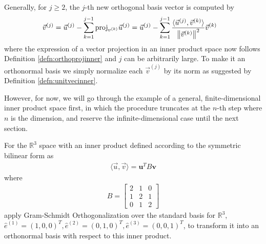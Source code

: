 \begin{defn}
\begin{align}
\end{align}
Generally, for $j \geq 2$, the $j$-th new orthogonal basis vector is computed by
\begin{align}
\vec{v}^{(j)} &= \vec{u}^{(j)} - \sum_{k=1}^{j-1}\text{proj}_{v^{(k)}}\vec{u}^{(j)}  = \vec{u}^{(j)} - \sum_{k=1}^{j-1}\frac{\langle \vec{u}^{(j)}, \vec{v}^{(k)} \rangle}{\norm{\vec{v}^{(k)}}^2} \vec{v}^{(k)}
\end{align}
where the expression of a vector projection in an inner product space now follows Definition \ref{defn:orthoprojinner} and $j$ can be arbitrarily large. To make it an orthonormal basis we simply normalize each $\vec{v}^{(j)}$ by its norm as suggested by Definition \ref{defn:unitvecinner}.  
\end{defn}
However, for now, we will go through the example of a general, finite-dimensional inner product space first, in which the procedure truncates at the $n$-th step where $n$ is the dimension, and reserve the infinite-dimensional case until the next section.
\begin{exmp}
\label{exmp:R3innerGS}
For the $\mathbb{R}^3$ space with an inner product defined according to the symmetric bilinear form as
\begin{align*}
\langle \vec{u}, \vec{v} \rangle = \textbf{u}^TB\textbf{v}
\end{align*}
where 
\begin{align*}
B =
\begin{bmatrix}
2&1&0\\ 
1&2&1\\
0&1&2
\end{bmatrix}
\end{align*}
apply Gram-Schmidt Orthogonalization over the standard basis for $\mathbb{R}^3$, $\hat{e}^{(1)} = (1,0,0)^T, \hat{e}^{(2)} = (0,1,0)^T, \hat{e}^{(3)} = (0,0,1)^T$, to transform it into an orthonormal basis with respect to this inner product.
\end{exmp}
